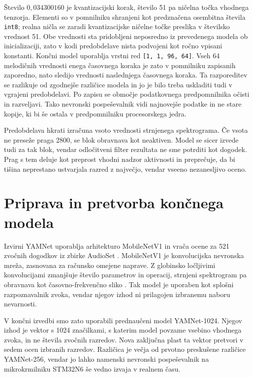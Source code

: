Število $0{,}034300160$ je kvantizacijski korak, število 51 pa ničelna točka
vhodnega tenzorja. Elementi so v pomnilniku shranjeni kot predznačena osembitna
števila \texttt{int8}; realna ničla se zaradi kvantizacijske ničelne točke
preslika v številsko vrednost 51. Obe vrednosti sta pridobljeni neposredno iz prevedenega
modela ob inicializaciji, zato v kodi predobdelave nista podvojeni kot ročno
vpisani konstanti. Končni model uporablja vrstni red
\texttt{[1, 1, 96, 64]}. Vseh 64 melodičnih vrednosti enega časovnega koraka je
zato v pomnilniku zapisanih zaporedno, nato sledijo vrednosti naslednjega
časovnega koraka. Ta razporeditev se razlikuje od zgodnejše različice modela in
jo je bilo treba uskladiti tudi v vgrajeni predobdelavi. Po zapisu se območje
podatkovnega predpomnilnika očisti in razveljavi. Tako nevronski pospeševalnik
vidi najnovejše podatke in ne stare kopije, ki bi še ostala v predpomnilniku
procesorskega jedra.

Predobdelava hkrati izračuna vsoto vrednosti strnjenega spektrograma. Če vsota ne preseže
praga 2800, se blok obravnava kot neaktiven. Model se sicer izvede tudi za tak
blok, vendar odločitveni filter rezultata ne sme potrditi kot dogodek. Prag s
tem deluje kot preprost vhodni nadzor aktivnosti in preprečuje, da bi tišina
neprestano ustvarjala razred z največjo, vendar vseeno nezanesljivo oceno.

\section{Priprava in pretvorba končnega modela}

Izvirni YAMNet uporablja arhitekturo MobileNetV1 in vrača ocene za 521
zvočnih dogodkov iz zbirke AudioSet
\cite{tensorflowyamnet,hershey2017cnn,gemmeke2017audioset}.
MobileNetV1 je konvolucijska nevronska mreža, zasnovana za računsko omejene
naprave. Z globinsko ločljivimi konvolucijami zmanjšuje število parametrov in
operacij, strnjeni spektrogram pa obravnava kot časovno-frekvenčno sliko
\cite{howard2017mobilenets}. Tak model je
uporaben kot splošni razpoznavalnik zvoka, vendar njegov izhod ni prilagojen
izbranemu naboru nevarnosti.

V končni izvedbi smo zato uporabili prednaučeni model YAMNet-1024. Njegov izhod
je vektor s 1024 značilkami, s katerim
model povzame vsebino vhodnega zvoka, in ne števila zvočnih razredov. Nova
zaključna plast ta vektor pretvori v sedem ocen izbranih razredov. Različica je
večja od prvotno preskušene različice YAMNet-256, vendar jo lahko namenski
nevronski pospeševalnik na mikrokrmilniku STM32N6 še vedno izvaja v realnem
času.


